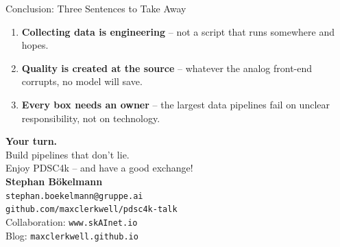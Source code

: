 \documentclass[aspectratio=169]{beamer}
\begin{document}
\begin{frame}{Conclusion: Three Sentences to Take Away}
  \begin{enumerate}
    \item \textbf{Collecting data is engineering} –
          not a script that runs somewhere and hopes.
    \item \textbf{Quality is created at the source} –
          whatever the analog front-end corrupts, no model will save.
    \item \textbf{Every box needs an owner} –
          the largest data pipelines fail on unclear responsibility,
          not on technology.
  \end{enumerate}
\end{frame}

\begin{frame}
  \begin{center}
    {\Huge \textbf{Your turn.}}\\[1em]
    {\large Build pipelines that don't lie.}\\
    {\large Enjoy PDSC4k – and have a good exchange!}\\[2em]
    \textbf{Stephan Bökelmann}\\
    \texttt{stephan.boekelmann@gruppe.ai}\\[1em]
    \small
    \texttt{github.com/maxclerkwell/pdsc4k-talk}\\[0.4em]
    Collaboration: \texttt{www.skAInet.io}\\
    Blog: \texttt{maxclerkwell.github.io}
  \end{center}
\end{frame}
\end{document}

